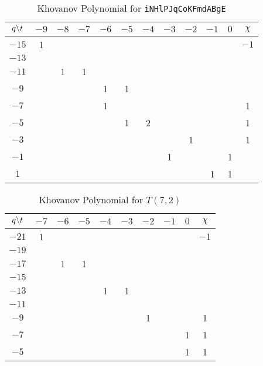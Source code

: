 \documentclass{article}
\theoremstyle{plain}
\begin{document}
        \begin{table}[H]
            \centering
            \begin{tabular}{| c | c | c | c | c | c | c | c | c | c | c | c |}
                \hline
                $q\symbol{92}t$&$-9$&$-8$&$-7$&$-6$&$-5$&$-4$&$-3$&$-2$&$-1$&$0$&$\chi$\\
                \hline
                $-15$&1&&&&&&&&&&$-1$\\
                \hline
                $-13$&&&&&&&&&&&\\
                \hline
                $-11$&&1&1&&&&&&&&\\
                \hline
                $-9$&&&&1&1&&&&&&\\
                \hline
                $-7$&&&&1&&&&&&&1\\
                \hline
                $-5$&&&&&1&2&&&&&1\\
                \hline
                $-3$&&&&&&&&1&&&1\\
                \hline
                $-1$&&&&&&&1&&&1&\\
                \hline
                $1$&&&&&&&&&1&1&\\
                \hline
            \end{tabular}
            \caption{Khovanov Polynomial for \texttt{iNHlPJqCoKFmdABgE}}
            \label{table:iNHlPJqCoKFmdABgE_kho}
        \end{table}
        \begin{table}[H]
            \centering
            \begin{tabular}{| c | c | c | c | c | c | c | c | c | c |}
                \hline
                $q\symbol{92}t$&$-7$&$-6$&$-5$&$-4$&$-3$&$-2$&$-1$&$0$&$\chi$\\
                \hline
                $-21$&1&&&&&&&&$-1$\\
                \hline
                $-19$&&&&&&&&&\\
                \hline
                $-17$&&1&1&&&&&&\\
                \hline
                $-15$&&&&&&&&&\\
                \hline
                $-13$&&&&1&1&&&&\\
                \hline
                $-11$&&&&&&&&&\\
                \hline
                $-9$&&&&&&1&&&1\\
                \hline
                $-7$&&&&&&&&1&1\\
                \hline
                $-5$&&&&&&&&1&1\\
                \hline
            \end{tabular}
            \caption{Khovanov Polynomial for $T(7,2)$}
            \label{table:t_7_2_kho}
        \end{table}
\end{document}
